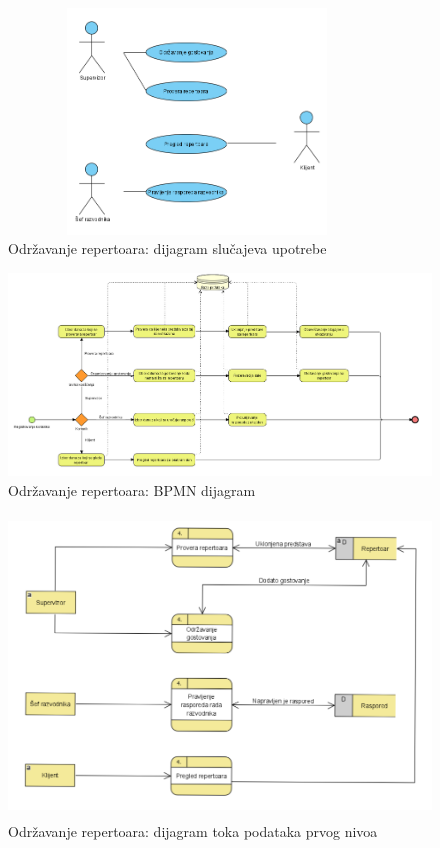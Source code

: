 \documentclass[a4paper]{article}
\begin{document}
  
\begin{figure}[H]
  \begin{center}
      \includegraphics[width=100mm,height=60mm]{../images/usecase_odrzavanje_repertoara.png}
  \end{center}
  \caption{Održavanje repertoara: dijagram slučajeva upotrebe}
  \label{usecase_odrzavanje_repertoara}
\end{figure}

\begin{figure}[H]
  \begin{center}
      \includegraphics[width=160mm]{../images/bpmn_odrzavanje_repertoara.png}
  \end{center}
  \caption{Održavanje repertoara: BPMN dijagram}
  \label{bpmn_odrzavanje_repertoara}
\end{figure}

\begin{figure}[H]
  \begin{center}
      \includegraphics[width=120mm,height=80mm]{../images/dfd2_odrzavanje_repertoara.png}
  \end{center}
  \caption{Održavanje repertoara: dijagram toka podataka prvog nivoa}
  \label{dfd2_odrzavanje_repertoara}
\end{figure}
\end{document}
